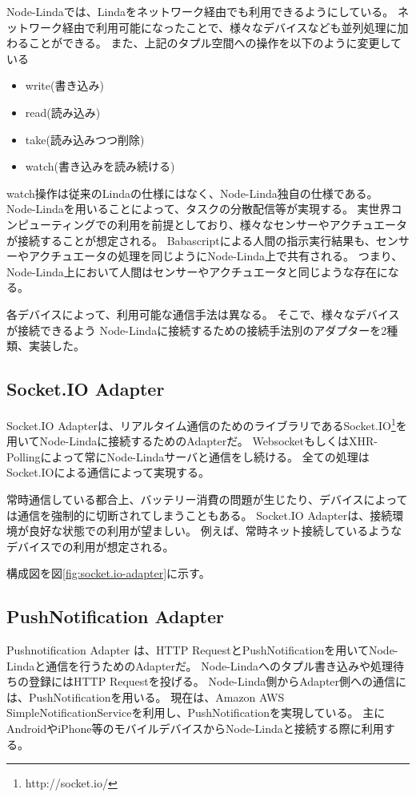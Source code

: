 Node-Lindaでは、Lindaをネットワーク経由でも利用できるようにしている。
ネットワーク経由で利用可能になったことで、様々なデバイスなども並列処理に加わることができる。
また、上記のタプル空間への操作を以下のように変更している

\begin{itemize}
\itemsep1pt\parskip0pt
\item
  write(書き込み)
\item
  read(読み込み)
\item
  take(読み込みつつ削除)
\item
  watch(書き込みを読み続ける)
\end{itemize}

watch操作は従来のLindaの仕様にはなく、Node-Linda独自の仕様である。
Node-Lindaを用いることによって、タスクの分散配信等が実現する。
実世界コンピューティングでの利用を前提としており、様々なセンサーやアクチュエータが接続することが想定される。
Babascriptによる人間の指示実行結果も、センサーやアクチュエータの処理を同じようにNode-Linda上で共有される。
つまり、Node-Linda上において人間はセンサーやアクチュエータと同じような存在になる。

各デバイスによって、利用可能な通信手法は異なる。
そこで、様々なデバイスが接続できるよう
Node-Lindaに接続するための接続手法別のアダプターを2種類、実装した。

\subsection{Socket.IO Adapter}\label{socket.io-adapter}

Socket.IO
Adapterは、リアルタイム通信のためのライブラリであるSocket.IO\footnote{http://socket.io/}を用いてNode-Lindaに接続するためのAdapterだ。
WebsocketもしくはXHR-Pollingによって常にNode-Lindaサーバと通信をし続ける。
全ての処理はSocket.IOによる通信によって実現する。

常時通信している都合上、バッテリー消費の問題が生じたり、デバイスによっては通信を強制的に切断されてしまうこともある。
Socket.IO Adapterは、接続環境が良好な状態での利用が望ましい。
例えば、常時ネット接続しているようなデバイスでの利用が想定される。

構成図を図\ref{fig:socket.io-adapter}に示す。

\subsection{PushNotification Adapter}\label{pushnotification-adapter}

Pushnotification Adapter は、HTTP
RequestとPushNotificationを用いてNode-Lindaと通信を行うためのAdapterだ。
Node-Lindaへのタプル書き込みや処理待ちの登録にはHTTP Requestを投げる。
Node-Linda側からAdapter側への通信には、PushNotificationを用いる。
現在は、Amazon AWS
SimpleNotificationServiceを利用し、PushNotificationを実現している。
主にAndroidやiPhone等のモバイルデバイスからNode-Lindaと接続する際に利用する。

